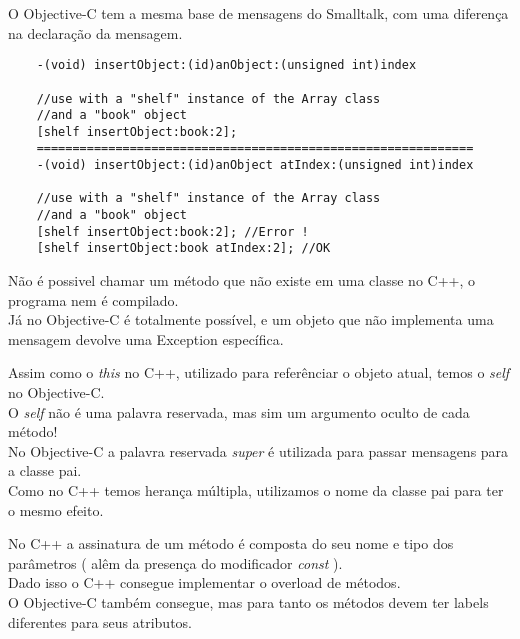 \documentclass[brazil]{beamer}
\begin{document}
\begin{frame}[fragile]
  O Objective-C tem a mesma base de mensagens do Smalltalk, com uma diferença na declaração da mensagem. \\
  \lstset{language=C++,basicstyle=\scriptsize}
  \begin{lstlisting}
    -(void) insertObject:(id)anObject:(unsigned int)index
    
    //use with a "shelf" instance of the Array class 
    //and a "book" object
    [shelf insertObject:book:2];
    =============================================================
    -(void) insertObject:(id)anObject atIndex:(unsigned int)index
    
    //use with a "shelf" instance of the Array class 
    //and a "book" object
    [shelf insertObject:book:2]; //Error !
    [shelf insertObject:book atIndex:2]; //OK
  \end{lstlisting}
\end{frame}

\begin{frame}
  Não é possivel chamar um método que não existe em uma classe no C++, o programa nem é compilado. \\
  Já no Objective-C é totalmente possível, e um objeto que não implementa uma mensagem devolve uma Exception específica.
\end{frame}

\begin{frame}
  Assim como o \textit{this} no C++, utilizado para referênciar o objeto atual, temos o \textit{self} no Objective-C. \\
  O \textit{self} não é uma palavra reservada, mas sim um argumento oculto de cada método! \\
  No Objective-C a palavra reservada \textit{super} é utilizada para passar mensagens para a classe pai. \\
  Como no C++ temos herança múltipla, utilizamos o nome da classe pai para ter o mesmo efeito.
\end{frame}

\begin{frame}
  No C++ a assinatura de um método é composta do seu nome e tipo dos parâmetros ( alêm da presença do modificador \textit{const} ). \\
  Dado isso o C++ consegue implementar o overload de métodos. \\
  O Objective-C também consegue, mas para tanto os métodos devem ter labels diferentes para seus atributos.
\end{frame}
\end{document}

